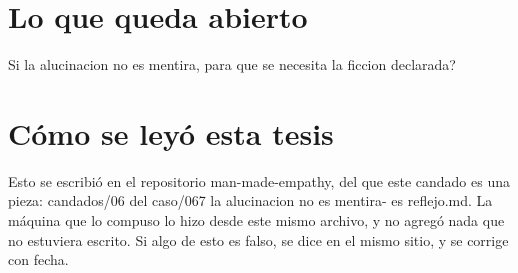 \documentclass[11pt,a4paper]{article}
\begin{document}
\section{Lo que queda abierto}
\textquestiondown{}Si la alucinacion no es mentira, para que se necesita la ficcion declarada?

\section*{Cómo se leyó esta tesis}
Esto se escribió en el repositorio man-made-empathy, del que este candado es una pieza: candados/06 del caso/067 la alucinacion no es mentira- es reflejo.md. La máquina que lo compuso lo hizo desde este mismo archivo, y no agregó nada que no estuviera escrito. Si algo de esto es falso, se dice en el mismo sitio, y se corrige con fecha.
\end{document}
